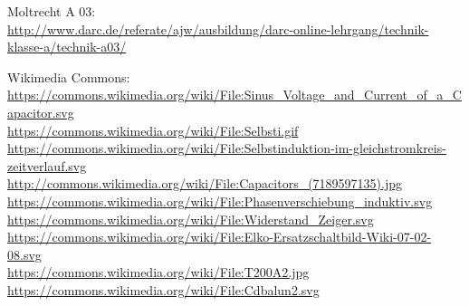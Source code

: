 \begin{thebibliography}{}
     Moltrecht A 03: \\
                    \url{http://www.darc.de/referate/ajw/ausbildung/darc-online-lehrgang/technik-klasse-a/technik-a03/}

        Wikimedia Commons: \\
                    \url{https://commons.wikimedia.org/wiki/File:Sinus_Voltage_and_Current_of_a_Capacitor.svg}\\
                    \url{https://commons.wikimedia.org/wiki/File:Selbsti.gif}\\
                    \url{https://commons.wikimedia.org/wiki/File:Selbstinduktion-im-gleichstromkreis-zeitverlauf.svg}\\
                    \url{http://commons.wikimedia.org/wiki/File:Capacitors_(7189597135).jpg}\\
                    \url{https://commons.wikimedia.org/wiki/File:Phasenverschiebung_induktiv.svg}\\
                    \url{https://commons.wikimedia.org/wiki/File:Widerstand_Zeiger.svg}\\
                    \url{https://commons.wikimedia.org/wiki/File:Elko-Ersatzschaltbild-Wiki-07-02-08.svg}\\
                    \url{https://commons.wikimedia.org/wiki/File:T200A2.jpg}\\
                    \url{https://commons.wikimedia.org/wiki/File:Cdbalun2.svg}\\
\end{thebibliography} 


